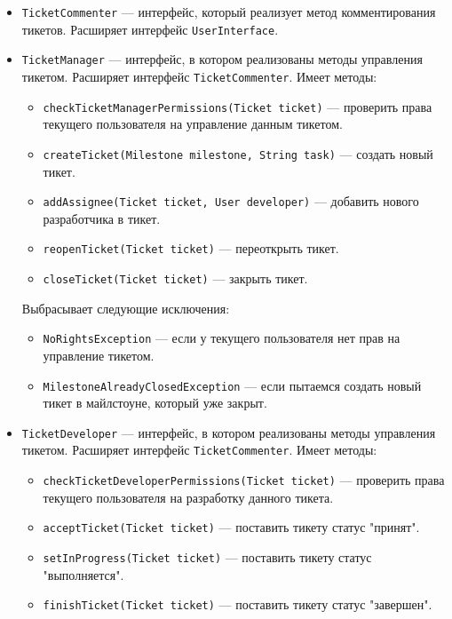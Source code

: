 \begin{itemize}
		\item \texttt{TicketCommenter} --- интерфейс, который реализует метод комментирования тикетов. Расширяет интерфейс \texttt{UserInterface}.
		
		\item \texttt{TicketManager} --- интерфейс, в котором реализованы методы управления тикетом. Расширяет интерфейс \texttt{TicketCommenter}. Имеет методы:
		\begin{itemize}
			\item \texttt{checkTicketManagerPermissions(Ticket ticket)} --- проверить права текущего пользователя на управление данным тикетом.
			\item \texttt{createTicket(Milestone milestone, String task)} --- создать новый тикет.
			\item \texttt{addAssignee(Ticket ticket, User developer)} --- добавить нового разработчика в тикет.	
			\item \texttt{reopenTicket(Ticket ticket)} --- переоткрыть тикет.
			\item \texttt{closeTicket(Ticket ticket)} --- закрыть тикет.
		\end{itemize}
		
		Выбрасывает следующие исключения:
		\begin{itemize}
			\item \texttt{NoRightsException} --- если у текущего пользователя нет прав на управление тикетом.
			\item \texttt{MilestoneAlreadyClosedException} --- если пытаемся создать новый тикет в майлстоуне, который уже закрыт.
		\end{itemize}
		
		\item \texttt{TicketDeveloper} --- интерфейс, в котором реализованы методы управления тикетом. Расширяет интерфейс \texttt{TicketCommenter}. Имеет методы:
		\begin{itemize}
			\item \texttt{checkTicketDeveloperPermissions(Ticket ticket)} --- проверить права текущего пользователя на разработку данного тикета.
			\item \texttt{acceptTicket(Ticket ticket)} --- поставить тикету статус "принят".
			\item \texttt{setInProgress(Ticket ticket)} --- поставить тикету статус "выполняется".	
			\item \texttt{finishTicket(Ticket ticket)} --- поставить тикету статус "завершен".
		\end{itemize}
		

\end{itemize}
